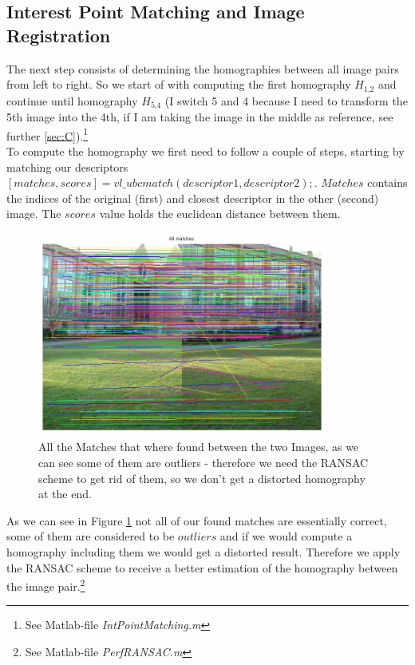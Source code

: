 \documentclass[subfigure,epsfig,fleqn,float,numbers=noenddot]{scrartcl}
\begin{document}
\subsection{Interest Point Matching and Image Registration}
\label{sec:B}
The next step consists of determining the homographies between all image pairs from left to right. So we start of with computing the first homography $H_\text{1,2}$ and continue until homography $H_\text{5,4}$ (I switch 5 and 4 because I need to transform the 5th image into the 4th, if I am taking the image in the middle as reference, see further \ref{sec:C}).\footnote{See Matlab-file \emph{IntPointMatching.m} } \\
To compute the homography we first need to follow a couple of steps, starting by matching our descriptors $[matches, scores] = vl\_ubcmatch(descriptor1, descriptor2);$. $Matches$ contains the indices of the original (first) and closest descriptor in the other (second) image. The $scores$ value holds the euclidean distance between them.\\
	\begin{figure}[H]
		\centering
		\includegraphics[width=0.85\textwidth]{./img/allMatches.jpg}
		\caption{All the Matches that where found between the two Images, as we can see some of them are outliers - therefore we need the RANSAC scheme to get rid of them, so we don't get a distorted homography at the end.}
		\label{img:outliers}
	\end{figure}
As we can see in Figure \ref{img:outliers} not all of our found matches are essentially correct, some of them are considered to be $outliers$ and if we would compute a homography including them we would get a distorted result. Therefore we apply the RANSAC scheme to receive a better estimation of the homography between the image pair.\footnote{See Matlab-file \emph{PerfRANSAC.m} } 
\end{document}

